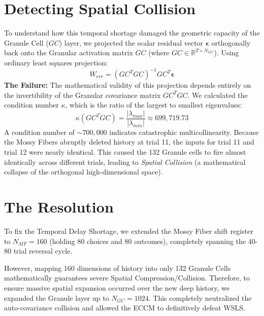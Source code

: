 \documentclass[11pt,a4paper]{article}
\begin{document}
\section{Detecting Spatial Collision}
To understand how this temporal shortage damaged the geometric capacity of the Granule Cell ($GC$) layer, we projected the scalar residual vector $\boldsymbol{\epsilon}$ orthogonally back onto the Granular activation matrix $GC$ (where $GC \in \mathbb{R}^{T \times N_{GC}}$). Using ordinary least squares projection:
\begin{equation}
    W_{err} = (GC^T GC)^{-1} GC^T \boldsymbol{\epsilon}
\end{equation}
\textbf{The Failure:} The mathematical validity of this projection depends entirely on the invertibility of the Granular covariance matrix $GC^T GC$. We calculated the condition number $\kappa$, which is the ratio of the largest to smallest eigenvalues:
\begin{equation}
    \kappa(GC^T GC) = \frac{|\lambda_{max}|}{|\lambda_{min}|} \approx 699,719.73
\end{equation}
A condition number of $\sim 700,000$ indicates catastrophic multicollinearity. Because the Mossy Fibers abruptly deleted history at trial 11, the inputs for trial 11 and trial 12 were nearly identical. This caused the 132 Granule cells to fire almost identically across different trials, leading to \textit{Spatial Collision} (a mathematical collapse of the orthogonal high-dimensional space).

\section{The Resolution}
To fix the Temporal Delay Shortage, we extended the Mossy Fiber shift register to $N_{MF} = 160$ (holding 80 choices and 80 outcomes), completely spanning the 40-80 trial reversal cycle.

However, mapping 160 dimensions of history into only 132 Granule Cells mathematically guarantees severe Spatial Compression/Collision. Therefore, to ensure massive spatial expansion occurred over the new deep history, we expanded the Granule layer up to $N_{GC} = 1024$. This completely neutralized the auto-covariance collision and allowed the ECCM to definitively defeat WSLS.
\end{document}
